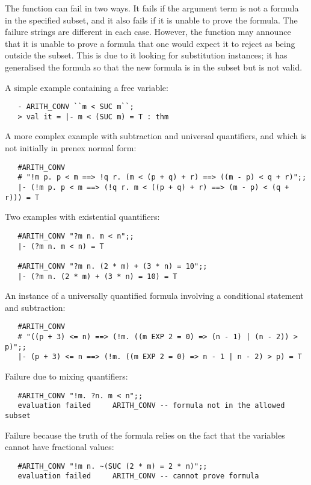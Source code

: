 \FAILURE
The function can fail in two ways. It fails if the argument term is not a
formula in the specified subset, and it also fails if it is unable to prove
the formula. The failure strings are different in each case. However, the
function may announce that it is unable to prove a formula that one would
expect it to reject as being outside the subset. This is due to it looking for
substitution instances; it has generalised the formula so that the new formula
is in the subset but is not valid.

\EXAMPLE
A simple example containing a free variable:
{\par\samepage\setseps\small
\begin{verbatim}
   - ARITH_CONV ``m < SUC m``;
   > val it = |- m < (SUC m) = T : thm
\end{verbatim}}\noindent 
A more complex example with subtraction and universal quantifiers, and
which is not initially in prenex normal form:
{\par\samepage\setseps\small
\begin{verbatim}
   #ARITH_CONV
   # "!m p. p < m ==> !q r. (m < (p + q) + r) ==> ((m - p) < q + r)";;
   |- (!m p. p < m ==> (!q r. m < ((p + q) + r) ==> (m - p) < (q + r))) = T
\end{verbatim}}\noindent 
Two examples with existential quantifiers:
{\par\samepage\setseps\small
\begin{verbatim}
   #ARITH_CONV "?m n. m < n";;
   |- (?m n. m < n) = T

   #ARITH_CONV "?m n. (2 * m) + (3 * n) = 10";;
   |- (?m n. (2 * m) + (3 * n) = 10) = T
\end{verbatim}}\noindent 
An instance of a universally quantified formula involving a conditional
statement and subtraction:
{\par\samepage\setseps\small
\begin{verbatim}
   #ARITH_CONV
   # "((p + 3) <= n) ==> (!m. ((m EXP 2 = 0) => (n - 1) | (n - 2)) > p)";;
   |- (p + 3) <= n ==> (!m. ((m EXP 2 = 0) => n - 1 | n - 2) > p) = T
\end{verbatim}}\noindent 
Failure due to mixing quantifiers:
{\par\samepage\setseps\small
\begin{verbatim}
   #ARITH_CONV "!m. ?n. m < n";;
   evaluation failed     ARITH_CONV -- formula not in the allowed subset
\end{verbatim}}\noindent 
Failure because the truth of the formula relies on the fact that the
variables cannot have fractional values:
{\par\samepage\setseps\small
\begin{verbatim}
   #ARITH_CONV "!m n. ~(SUC (2 * m) = 2 * n)";;
   evaluation failed     ARITH_CONV -- cannot prove formula
\end{verbatim}}

